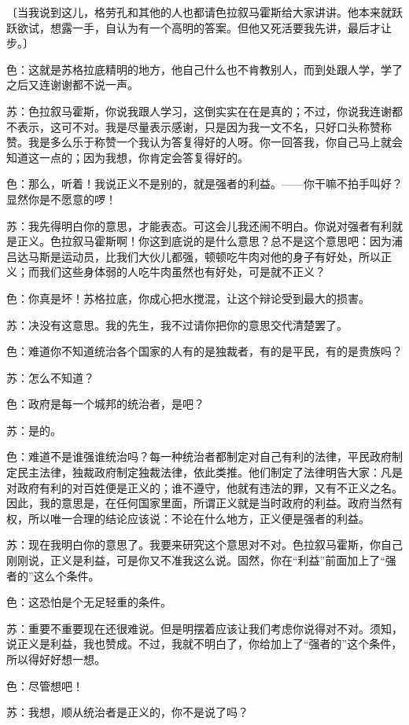 \documentclass[11pt,oneside]{book}
\begin{document}
\begin{common-format}
〔当我说到这儿，格劳孔和其他的人也都请色拉叙马霍斯给大家讲讲。他本来就跃跃欲试，想露一手，自认为有一个高明的答案。但他又死活要我先讲，最后才让步。〕

色：这就是苏格拉底精明的地方，他自己什么也不肯教别人，而到处跟人学，学了之后又连谢谢都不说一声。

苏：色拉叙马霍斯，你说我跟人学习，这倒实实在在是真的；不过，你说我连谢都不表示，这可不对。我是尽量表示感谢，只是因为我一文不名，只好口头称赞称赞。我是多么乐于称赞一个我认为答复得好的人呀。你一回答我，你自己马上就会知道这一点的；因为我想，你肯定会答复得好的。

色：那么，听着！我说正义不是别的，就是强者的利益。——你干嘛不拍手叫好？显然你是不愿意的啰！

苏：我先得明白你的意思，才能表态。可这会儿我还闹不明白。你说对强者有利就是正义。色拉叙马霍斯啊！你这到底说的是什么意思？总不是这个意思吧：因为浦吕达马斯是运动员，比我们大伙儿都强，顿顿吃牛肉对他的身子有好处，所以正义；而我们这些身体弱的人吃牛肉虽然也有好处，可是就不正义？

色：你真是坏！苏格拉底，你成心把水搅混，让这个辩论受到最大的损害。

苏：决没有这意思。我的先生，我不过请你把你的意思交代清楚罢了。

色：难道你不知道统治各个国家的人有的是独裁者，有的是平民，有的是贵族吗？

苏：怎么不知道？

色：政府是每一个城邦的统治者，是吧？

苏：是的。

色：难道不是谁强谁统治吗？每一种统治者都制定对自己有利的法律，平民政府制定民主法律，独裁政府制定独裁法律，依此类推。他们制定了法律明告大家：凡是对政府有利的对百姓便是正义的；谁不遵守，他就有违法的罪，又有不正义之名。因此，我的意思是，在任何国家里面，所谓正义就是当时政府的利益。政府当然有权，所以唯一合理的结论应该说：不论在什么地方，正义便是强者的利益。

苏：现在我明白你的意思了。我要来研究这个意思对不对。色拉叙马霍斯，你自己刚刚说，正义是利益，可是你又不准我这么说。固然，你在“利益”前面加上了“强者的”这么个条件。

色：这恐怕是个无足轻重的条件。

苏：重要不重要现在还很难说。但是明摆着应该让我们考虑你说得对不对。须知，说正义是利益，我也赞成。不过，我就不明白了，你给加上了“强者的”这个条件，所以得好好想一想。

色：尽管想吧！

苏：我想，顺从统治者是正义的，你不是说了吗？


\end{common-format}
\end{document}
